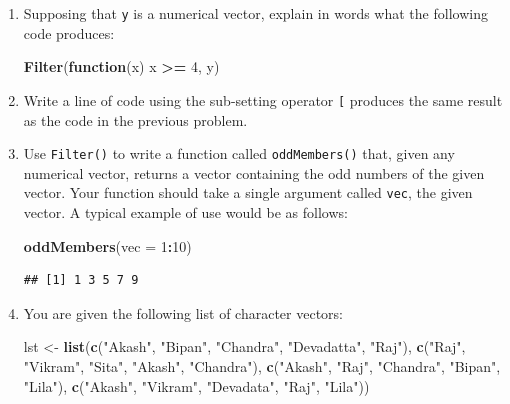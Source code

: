 \documentclass[]{book}
\makeatletter
\newenvironment{Shaded}{\begin{snugshade}}{\end{snugshade}}
\newcommand{\KeywordTok}[1]{\textcolor[rgb]{0.13,0.29,0.53}{\textbf{#1}}}
\newcommand{\DataTypeTok}[1]{\textcolor[rgb]{0.13,0.29,0.53}{#1}}
\newcommand{\DecValTok}[1]{\textcolor[rgb]{0.00,0.00,0.81}{#1}}
\newcommand{\StringTok}[1]{\textcolor[rgb]{0.31,0.60,0.02}{#1}}
\newcommand{\ControlFlowTok}[1]{\textcolor[rgb]{0.13,0.29,0.53}{\textbf{#1}}}
\newcommand{\OperatorTok}[1]{\textcolor[rgb]{0.81,0.36,0.00}{\textbf{#1}}}
\newcommand{\NormalTok}[1]{#1}
\newenvironment{kframe}{%
\medskip{}
\setlength{\fboxsep}{.8em}
 \def\at@end@of@kframe{}%
 \ifinner\ifhmode%
  \def\at@end@of@kframe{\end{minipage}}%
  \begin{minipage}{\columnwidth}%
 \fi\fi%
 \def\FrameCommand##1{\hskip\@totalleftmargin \hskip-\fboxsep
 \colorbox{shadecolor}{##1}\hskip-\fboxsep
     \hskip-\linewidth \hskip-\@totalleftmargin \hskip\columnwidth}%
 \MakeFramed {\advance\hsize-\width
   \@totalleftmargin\z@ \linewidth\hsize
   \@setminipage}}%
 {\par\unskip\endMakeFramed%
 \at@end@of@kframe}
\renewenvironment{Shaded}{\begin{kframe}}{\end{kframe}}
\theoremstyle{definition}
\theoremstyle{definition}
\theoremstyle{definition}
\theoremstyle{remark}
\makeatother
\begin{document}
{\begin{enumerate}
  Use \texttt{Map()} to refactor the code for \texttt{randomSims2()} so
  as to avoid using the loop.
\item
  Supposing that \texttt{y} is a numerical vector, explain in words what
  the following code produces:

\begin{Shaded}
\begin{Highlighting}[]
\KeywordTok{Filter}\NormalTok{(}\ControlFlowTok{function}\NormalTok{(x) x }\OperatorTok{>=}\StringTok{ }\DecValTok{4}\NormalTok{, y)}
\end{Highlighting}
\end{Shaded}
\item
  Write a line of code using the sub-setting operator \texttt{{[}}
  produces the same result as the code in the previous problem.
\item
  Use \texttt{Filter()} to write a function called \texttt{oddMembers()}
  that, given any numerical vector, returns a vector containing the odd
  numbers of the given vector. Your function should take a single
  argument called \texttt{vec}, the given vector. A typical example of
  use would be as follows:

\begin{Shaded}
\begin{Highlighting}[]
\KeywordTok{oddMembers}\NormalTok{(}\DataTypeTok{vec =} \DecValTok{1}\OperatorTok{:}\DecValTok{10}\NormalTok{)}
\end{Highlighting}
\end{Shaded}

\begin{verbatim}
## [1] 1 3 5 7 9
\end{verbatim}
\item
  You are given the following list of character vectors:

\begin{Shaded}
\begin{Highlighting}[]
\NormalTok{   lst <-}\StringTok{ }\KeywordTok{list}\NormalTok{(}\KeywordTok{c}\NormalTok{(}\StringTok{"Akash"}\NormalTok{, }\StringTok{"Bipan"}\NormalTok{, }\StringTok{"Chandra"}\NormalTok{, }\StringTok{"Devadatta"}\NormalTok{, }\StringTok{"Raj"}\NormalTok{),}
        \KeywordTok{c}\NormalTok{(}\StringTok{"Raj"}\NormalTok{, }\StringTok{"Vikram"}\NormalTok{, }\StringTok{"Sita"}\NormalTok{, }\StringTok{"Akash"}\NormalTok{, }\StringTok{"Chandra"}\NormalTok{),}
        \KeywordTok{c}\NormalTok{(}\StringTok{"Akash"}\NormalTok{, }\StringTok{"Raj"}\NormalTok{, }\StringTok{"Chandra"}\NormalTok{, }\StringTok{"Bipan"}\NormalTok{, }\StringTok{"Lila"}\NormalTok{),}
        \KeywordTok{c}\NormalTok{(}\StringTok{"Akash"}\NormalTok{, }\StringTok{"Vikram"}\NormalTok{, }\StringTok{"Devadata"}\NormalTok{, }\StringTok{"Raj"}\NormalTok{, }\StringTok{"Lila"}\NormalTok{))}
\end{Highlighting}
\end{Shaded}


\end{enumerate}}
\end{document}
